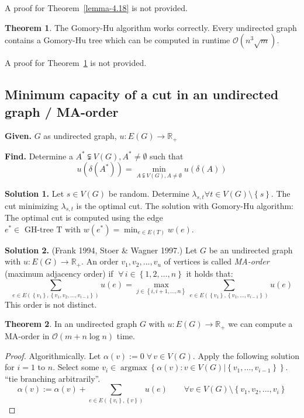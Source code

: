 \documentclass[a4paper]{article}
\theoremstyle{definition}
\newtheorem{theorem}{Theorem}
\newcommand{\set}[1]{\left\{#1\right\}}
\newcommand{\given}[1]{\textbf{Given.} #1\par}
\newcommand{\find}[1]{\textbf{Find.} #1\par}
\newcommand{\fall}{\;\forall\,}
\newcommand{\noproof}[1]{A proof for Theorem~\ref{#1} is not provided.}
\DeclareMathOperator{\argmax}{argmax}
\begin{document}
\noproof{lemma-4.18}

\begin{theorem}\label{satz-4.19}
  The Gomory-Hu algorithm works correctly.
  Every undirected graph contains a Gomory-Hu tree which can be computed in runtime $\mathcal{O}(n^3 \sqrt{m})$.
\end{theorem}

\noproof{satz-4.19}

\subsection{Minimum capacity of a cut in an undirected graph / MA-order}

\given{$G$ as undirected graph, $u: E(G) \rightarrow \mathbb{R}_+$}
\find{
  Determine a $A^* \subsetneqq V(G), A^* \neq \emptyset$ such that
  \[
    u(\delta(A^*)) = \min_{A \subsetneqq V(G), A \neq \emptyset} u(\delta(A))
  \]
}

\textbf{Solution 1.}
  Let $s \in V(G)$ be random. Determine $\lambda_{s,t} \forall t \in V(G) \setminus \set{s}$.
  The cut minimizing $\lambda_{s,t}$ is the optimal cut.
  The solution with Gomory-Hu algorithm: The optimal cut is computed using the edge $e^* \in \text{ GH-tree T with } w(e^*) = \min_{e \in E(T)} w(e)$.

\textbf{Solution 2.}
  (Frank 1994, Stoer \& Wagner 1997.)
  Let $G$ be an undirected graph with $u: E(G) \rightarrow \mathbb{R}_+$.
  An order $v_1, v_2, \ldots, v_u$ of vertices is called \emph{MA-order} (maximum adjacency order)
  if $\fall i \in \set{1, 2, \ldots, n}$ it holds that:
  \[
    \sum_{e \in E(\set{v_1}, \set{v_1, v_2, \ldots, v_{i-1}})} u(e)
      = \max_{j \in \set{i, i+1, \ldots, n}} \sum_{e \in E(\set{v_1}, \set{v_1, \ldots, v_{i-1}})} u(e)
  \]
  This order is not distinct.

\begin{theorem}\label{proposition-4.20}
  In an undirected graph $G$ with $u: E(G) \rightarrow \mathbb{R}_+$ we can compute a MA-order in $\mathcal{O}(m + n\log{n})$ time.
\end{theorem}

\begin{proof}
  Algorithmically. Let $\alpha(v) := 0 \fall v \in V(G)$. Apply the following solution for $i = 1$ to $n$.
  Select some $v_i \in \argmax{\set{\alpha(v): v \in V(G) | \set{v_1, \ldots, v_{i-1}}}}$.
  ``tie branching arbitrarily''.
  \[
    \alpha(v) := \alpha(v) + \sum_{e \in E(\set{v_i}, \set{v})} u(e)
      \qquad\forall v \in V(G) \setminus \set{v_1, v_2, \ldots, v_i}
  \]
\end{proof}
\end{document}
